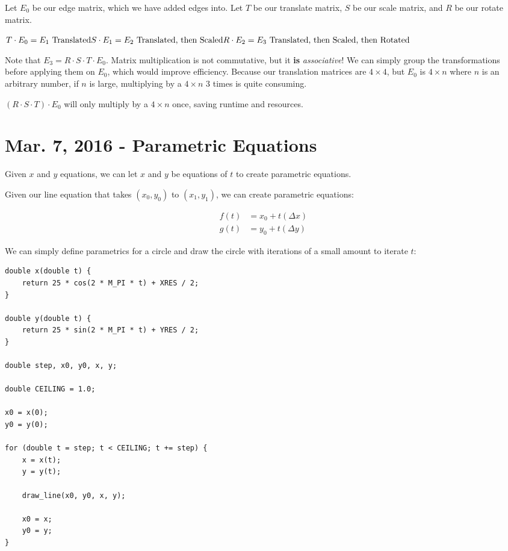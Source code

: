\documentclass[11pt,fleqn]{article}
\theoremstyle{definition}
\begin{document}
Let $E_0$ be our edge matrix, which we have added edges into. Let $T$ be our
translate matrix, $S$ be our scale matrix, and $R$ be our rotate matrix.

$
T \cdot E_0 = E_1 \text{ Translated} \\
S \cdot E_1 = E_2 \text{ Translated, then Scaled} \\
R \cdot E_2 = E_3 \text{ Translated, then Scaled, then Rotated}
$

Note that $E_3 = R \cdot S \cdot T \cdot E_0$. Matrix multiplication is not
commutative, but it \textbf{is} \textit{associative}! We can simply group the
transformations before applying them on $E_0$, which would improve efficiency.
Because our translation matrices are $4 \times 4$, but $E_0$ is $4 \times n$ where
$n$ is an arbitrary number, if $n$ is large, multiplying by a $4 \times n$ 3 times is
quite consuming.

$(R \cdot S \cdot T) \cdot E_0$ will only multiply by a $4 \times n$ once, saving
runtime and resources.

\section{Mar. 7, 2016 - Parametric Equations}

Given $x$ and $y$ equations, we can let $x$ and $y$ be equations of $t$ to create
parametric equations.

Given our line equation that takes $(x_0, y_0)$ to $(x_1, y_1)$, we can create
parametric equations:

\begin{align*}
    f(t) &= x_0 + t(\Delta x) \\
    g(t) &= y_0 + t(\Delta y)
\end{align*}

We can simply define parametrics for a circle and draw the circle with iterations of
a small amount to iterate $t$:

\begin{verbatim}
double x(double t) {
    return 25 * cos(2 * M_PI * t) + XRES / 2;
}

double y(double t) {
    return 25 * sin(2 * M_PI * t) + YRES / 2;
}

double step, x0, y0, x, y;

double CEILING = 1.0;

x0 = x(0);
y0 = y(0);

for (double t = step; t < CEILING; t += step) {
    x = x(t);
    y = y(t);

    draw_line(x0, y0, x, y);

    x0 = x;
    y0 = y;
}

\end{verbatim}
\end{document}
